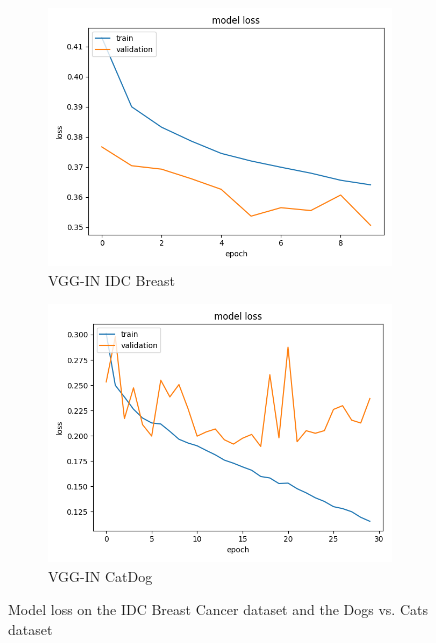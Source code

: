 \begin{figure}[h]
\begin{subfigure}[b]{.45\linewidth}
\includegraphics[width=\linewidth]{Figs/vgg_in_breast_loss.jpg}
\caption{VGG-IN IDC Breast}
\end{subfigure}
\begin{subfigure}[b]{.45\linewidth}
\includegraphics[width=\linewidth]{Figs/vgg_in_catdog_loss.jpg}
\caption{VGG-IN CatDog}
\end{subfigure}

\caption{Model loss on the IDC Breast Cancer dataset and the Dogs vs. Cats dataset}
\label{fig:loss2}
\end{figure}

